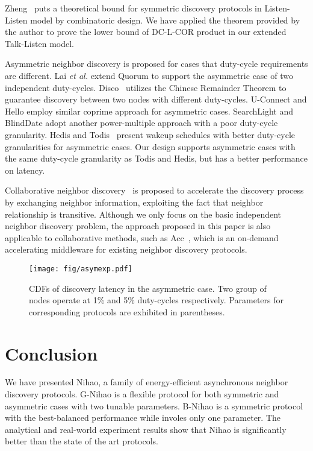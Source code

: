 \documentclass[conference]{IEEEtran}
\begin{document}
Zheng~\cite{zheng2003asynchronous} puts a theoretical bound for symmetric discovery protocols in Listen-Listen model by combinatoric design.
We have applied the theorem provided by the author to prove the lower bound of DC-L-COR product in our extended Talk-Listen model.

Asymmetric neighbor discovery is proposed for cases that duty-cycle requirements are different.
Lai \emph{et al.} extend Quorum to support the asymmetric case of two independent duty-cycles.
Disco~\cite{dutta2008practical} utilizes the Chinese Remainder Theorem to guarantee discovery between two nodes with different duty-cycles.
U-Connect and Hello employ similar coprime approach for asymmetric cases.
SearchLight and BlindDate adopt another power-multiple approach with a poor duty-cycle granularity.
Hedis and Todis~\cite{chen2015infocom} present wakeup schedules with better duty-cycle granularities for asymmetric cases.
Our design supports asymmetric cases with the same duty-cycle granularity as Todis and Hedis, but has a better performance on latency.

Collaborative neighbor discovery~\cite{zhang2012acc}\cite{cohen2011continuous}\cite{chen2012secon}\cite{purohit2011wiflock}
is proposed to accelerate the discovery process by exchanging neighbor information, exploiting the fact that neighbor relationship is transitive.
Although we only focus on the basic independent neighbor discovery problem, the approach proposed in this paper is also applicable to collaborative methods,
such as Acc~\cite{zhang2012acc}, which is an on-demand accelerating middleware for existing neighbor discovery protocols.

\begin{figure}[t]
    \centering
    \texttt{[image: fig/asymexp.pdf]}
    \caption{CDFs of discovery latency in the asymmetric case. Two group of nodes operate at 1\% and 5\% duty-cycles respectively. Parameters for corresponding protocols are exhibited in parentheses.}\label{asymexp}
\end{figure}

\section{Conclusion}\label{conclusion}
We have presented Nihao, a family of energy-efficient asynchronous neighbor discovery protocols.
G-Nihao is a flexible protocol for both symmetric and asymmetric cases with two tunable parameters.
B-Nihao is a symmetric protocol with the best-balanced performance while involes only one parameter.
The analytical and real-world experiment results show that Nihao is significantly better than the state of the art protocols.
\end{document}
